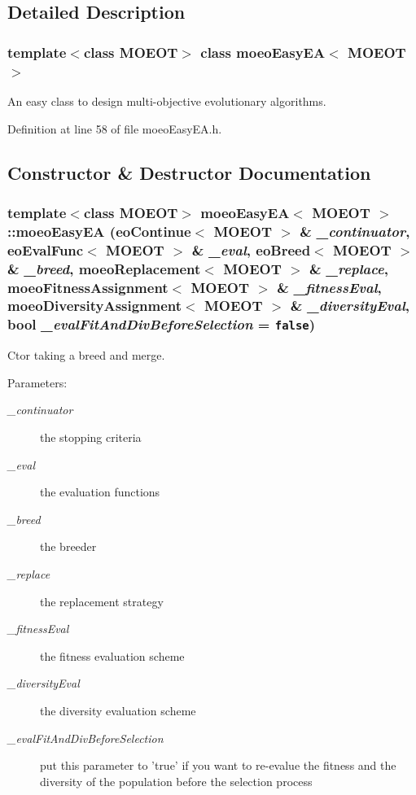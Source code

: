\subsection{Detailed Description}
\subsubsection*{template$<$class MOEOT$>$ class moeo\-Easy\-EA$<$ MOEOT $>$}

An easy class to design multi-objective evolutionary algorithms. 



Definition at line 58 of file moeo\-Easy\-EA.h.

\subsection{Constructor \& Destructor Documentation}
\subsubsection{\setlength{\rightskip}{0pt plus 5cm}template$<$class MOEOT$>$ \bf{moeo\-Easy\-EA}$<$ MOEOT $>$::\bf{moeo\-Easy\-EA} (\bf{eo\-Continue}$<$ MOEOT $>$ \& {\em \_\-continuator}, \bf{eo\-Eval\-Func}$<$ MOEOT $>$ \& {\em \_\-eval}, \bf{eo\-Breed}$<$ MOEOT $>$ \& {\em \_\-breed}, \bf{moeo\-Replacement}$<$ MOEOT $>$ \& {\em \_\-replace}, \bf{moeo\-Fitness\-Assignment}$<$ MOEOT $>$ \& {\em \_\-fitness\-Eval}, \bf{moeo\-Diversity\-Assignment}$<$ MOEOT $>$ \& {\em \_\-diversity\-Eval}, bool {\em \_\-eval\-Fit\-And\-Div\-Before\-Selection} = {\tt false})\hspace{0.3cm}{\tt  [inline]}}\label{classmoeoEasyEA_3f657699b8ed340ae3f51194206daa20}


Ctor taking a breed and merge. 

\begin{Desc}
\item[Parameters:]
\begin{description}
\item[{\em \_\-continuator}]the stopping criteria \item[{\em \_\-eval}]the evaluation functions \item[{\em \_\-breed}]the breeder \item[{\em \_\-replace}]the replacement strategy \item[{\em \_\-fitness\-Eval}]the fitness evaluation scheme \item[{\em \_\-diversity\-Eval}]the diversity evaluation scheme \item[{\em \_\-eval\-Fit\-And\-Div\-Before\-Selection}]put this parameter to 'true' if you want to re-evalue the fitness and the diversity of the population before the selection process \end{description}
\end{Desc}


